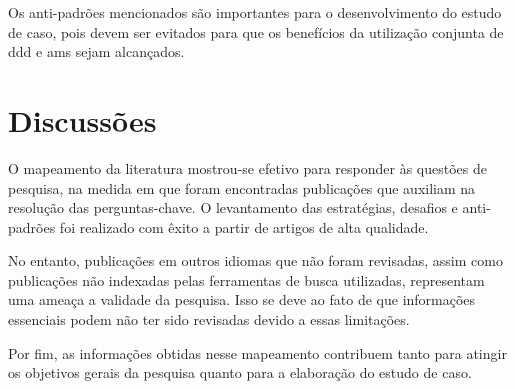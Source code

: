 Os anti-padrões mencionados são importantes para o desenvolvimento do estudo de caso, pois devem ser evitados para que os benefícios da utilização conjunta de \acrshort{ddd} e \acrshort{ams} sejam alcançados.

\section{Discussões}
O mapeamento da literatura mostrou-se efetivo para responder às questões de pesquisa, na medida em que foram encontradas publicações que auxiliam na resolução das perguntas-chave. O levantamento das estratégias, desafios e anti-padrões foi realizado com êxito a partir de artigos de alta qualidade.

No entanto, publicações em outros idiomas que não foram revisadas, assim como publicações não indexadas pelas ferramentas de busca utilizadas, representam uma ameaça a validade da pesquisa. Isso se deve ao fato de que informações essenciais podem não ter sido revisadas devido a essas limitações.

Por fim, as informações obtidas nesse mapeamento contribuem tanto para atingir os objetivos gerais da pesquisa quanto para a elaboração do estudo de caso.
